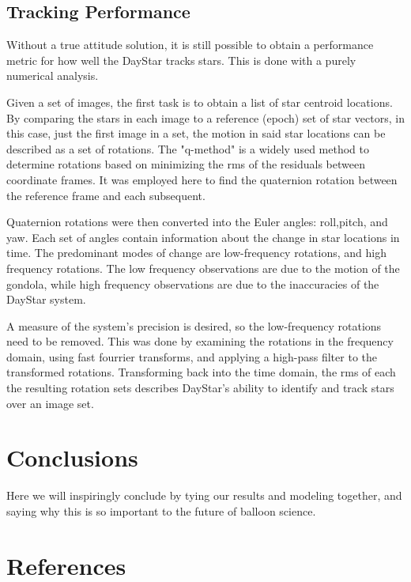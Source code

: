 \documentclass[twocolumn,letterpaper]{IEEEAerospace2012}
\begin{document}
\subsection{Tracking Performance}
Without a true attitude solution, it is still possible to obtain a performance metric for how well the DayStar tracks stars. This is done with a purely numerical analysis.

Given a set of images, the first task is to obtain a list of star centroid locations. By comparing the stars in each image to a reference (epoch) set of star vectors, in this case, just the first image in a set, the motion in said star locations can be described as a set of rotations. The "q-method" is a widely used method to determine rotations based on minimizing the rms of the residuals between coordinate frames. It was employed here to find the quaternion rotation between the reference frame and each subsequent.

Quaternion rotations were then converted into the Euler angles: roll,pitch, and yaw. Each set of angles contain information about the change in star locations in time. The predominant modes of change are low-frequency rotations, and high frequency rotations. The low frequency observations are due to the motion of the gondola, while high frequency observations are due to the inaccuracies of the DayStar system. 

A measure of the system's precision is desired, so the low-frequency rotations need to be removed. This was done by examining the rotations in the frequency domain, using fast fourrier transforms, and applying a high-pass filter to the transformed rotations. Transforming back into the time domain, the rms of each the resulting rotation sets describes DayStar's ability to identify and track stars over an image set. 

  

\section{Conclusions}
Here we will inspiringly conclude by tying our results and modeling together, and saying why this is so important to the future of balloon science.

\section{References}
\end{document}
